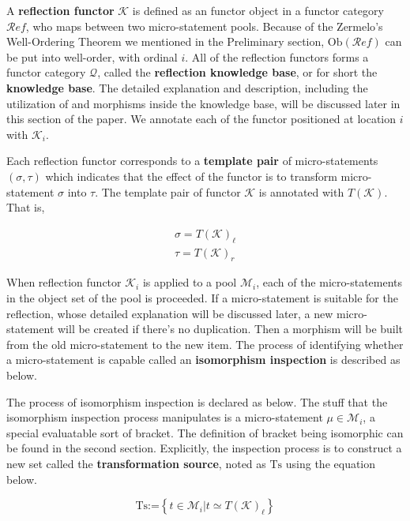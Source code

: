 \documentclass[preprint]{elsarticle}
\numberwithin{theorem}{section}	%
\numberwithin{axiom}{section}	%
\numberwithin{definition}{section}	%
\begin{document}
\begin{definition}
	A \textbf{ reflection functor} \(\mathcal{K}\) is defined as an functor object in a functor category \(\mathcal{R}\mathit{e}\mathit{f}\), who maps between two micro-statement pools. Because of the Zermelo{'}s Well-Ordering Theorem we mentioned in the Preliminary section, \(\text{Ob}(\mathcal{R}\mathit{e}\mathit{f})\) can be put into well-order, with ordinal \(i\). All of the reflection functors forms a functor category \(\mathcal{Q}\), called the \textbf{ reflection knowledge base}, or for short the \textbf{ knowledge base}. The detailed explanation and description, including the utilization of and morphisms inside the knowledge base, will be discussed later in this section of the paper. We annotate each of the functor positioned at location \(i\) with \(\mathcal{K}_i\).
	
	Each reflection functor corresponds to a \textbf{ template pair} of micro-statements \((\sigma ,\tau )\) which indicates that the effect of the functor is to transform micro-statement \(\sigma\) into $\tau $. The template pair of functor \(\mathcal{K}\) is annotated with \(T(\mathcal{K})\). That
	is,
	
	\begin{equation}
		\begin{gathered}
			\sigma =T(\mathcal{K})_{\ell }\\
			\tau =T(\mathcal{K})_{\mathit{r}}
		\end{gathered}
	\end{equation}
\end{definition}

When reflection functor \(\mathcal{K}_i\) is applied to a pool \(\mathcal{M}_i\), each of the micro-statements in the object set of the pool is proceeded. If a micro-statement is suitable for the reflection, whose detailed explanation will be discussed later, a new micro-statement will be created if there{'}s no duplication. Then a morphism will be built from the old micro-statement to the new item. The process of identifying whether a micro-statement is capable called an \textbf{ isomorphism inspection} is described as below.

\begin{definition}
	The process of isomorphism inspection is declared as below. The stuff that the isomorphism inspection process manipulates is a micro-statement \(\mu \in \mathcal{M}_i\), a special evaluatable sort of bracket. The definition of bracket being isomorphic can be found in the second section. Explicitly, the inspection process is to construct a new set called the \textbf{ transformation source}, noted as \(\text{Ts}\) using the equation below.
	
	\begin{equation}
		\text{Ts}\text{:=}\left\{t\in \mathcal{M}_i|t\simeq T(\mathcal{K})_{\ell }\right\}
	\end{equation}
\end{definition}
\end{document}

